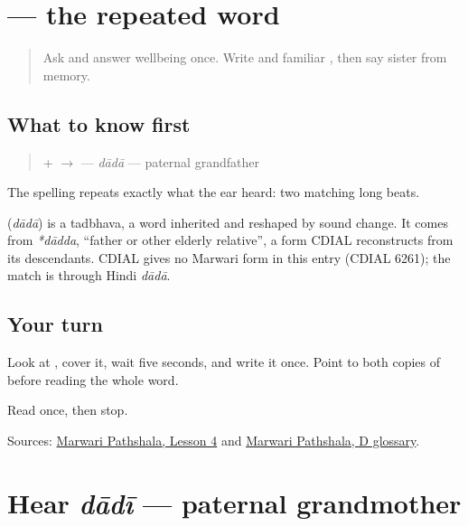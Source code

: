 \section[\texorpdfstring{\mw{दादा} (dādā)}{दादा (dādā)}]{ — the repeated word}

\label{lesson:MW-C08-dada}



\begin{quote}
Ask and answer wellbeing once. Write \textbf{} and familiar \textbf{}, then say sister from memory.
\end{quote}

\subsection*{What to know first}
\begin{quote}
\textbf{} + \textbf{} $\to$ \textbf{} — \emph{dādā} — paternal grandfather
\end{quote}

The spelling repeats exactly what the ear heard: two matching long beats.

\begin{cousinweb}
\textbf{} (\emph{dādā}) is a tadbhava, a word inherited and reshaped by sound change. It comes from \emph{*dādda}, \textquotedblleft{}father or other elderly relative\textquotedblright{}, a form CDIAL reconstructs from its descendants. CDIAL gives no Marwari form in this entry (CDIAL 6261); the match is through Hindi \emph{dādā}.
\end{cousinweb}

\subsection*{Your turn}
Look at \textbf{}, cover it, wait five seconds, and write it once. Point to both copies of \textbf{} before reading the whole word.

\begin{tcolorbox}[breakable,colback=teal!4,colframe=teal!35!black,title={Before you move on}]
Read \textbf{} once, then stop.

Sources: \href{https://www.marwaripathshala.com/marwari-lesson-4-english}{Marwari Pathshala, Lesson 4} and \href{https://www.marwaripathshala.com/d-glossary-of-rajasthani-language}{Marwari Pathshala, D glossary}.
\end{tcolorbox}
\section[dādī]{Hear \emph{dādī} — paternal grandmother}

